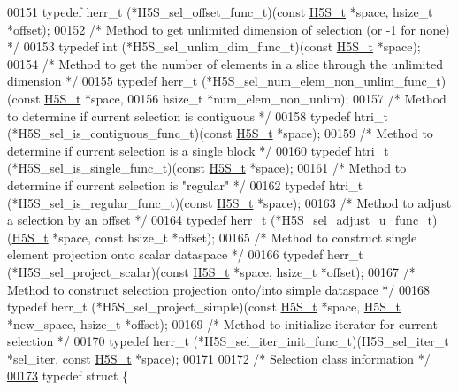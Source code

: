 \begin{DoxyCode}
00151 \textcolor{keyword}{typedef} herr\_t (*H5S\_sel\_offset\_func\_t)(\textcolor{keyword}{const} \hyperlink{struct_h5_s__t}{H5S\_t} *space, hsize\_t *offset);
00152 \textcolor{comment}{/* Method to get unlimited dimension of selection (or -1 for none) */}
00153 \textcolor{keyword}{typedef} int (*H5S\_sel\_unlim\_dim\_func\_t)(\textcolor{keyword}{const} \hyperlink{struct_h5_s__t}{H5S\_t} *space);
00154 \textcolor{comment}{/* Method to get the number of elements in a slice through the unlimited dimension */}
00155 \textcolor{keyword}{typedef} herr\_t (*H5S\_sel\_num\_elem\_non\_unlim\_func\_t)(\textcolor{keyword}{const} \hyperlink{struct_h5_s__t}{H5S\_t} *space,
00156     hsize\_t *num\_elem\_non\_unlim);
00157 \textcolor{comment}{/* Method to determine if current selection is contiguous */}
00158 \textcolor{keyword}{typedef} htri\_t (*H5S\_sel\_is\_contiguous\_func\_t)(\textcolor{keyword}{const} \hyperlink{struct_h5_s__t}{H5S\_t} *space);
00159 \textcolor{comment}{/* Method to determine if current selection is a single block */}
00160 \textcolor{keyword}{typedef} htri\_t (*H5S\_sel\_is\_single\_func\_t)(\textcolor{keyword}{const} \hyperlink{struct_h5_s__t}{H5S\_t} *space);
00161 \textcolor{comment}{/* Method to determine if current selection is "regular" */}
00162 \textcolor{keyword}{typedef} htri\_t (*H5S\_sel\_is\_regular\_func\_t)(\textcolor{keyword}{const} \hyperlink{struct_h5_s__t}{H5S\_t} *space);
00163 \textcolor{comment}{/* Method to adjust a selection by an offset */}
00164 \textcolor{keyword}{typedef} herr\_t (*H5S\_sel\_adjust\_u\_func\_t)(\hyperlink{struct_h5_s__t}{H5S\_t} *space, \textcolor{keyword}{const} hsize\_t *offset);
00165 \textcolor{comment}{/* Method to construct single element projection onto scalar dataspace */}
00166 \textcolor{keyword}{typedef} herr\_t (*H5S\_sel\_project\_scalar)(\textcolor{keyword}{const} \hyperlink{struct_h5_s__t}{H5S\_t} *space, hsize\_t *offset);
00167 \textcolor{comment}{/* Method to construct selection projection onto/into simple dataspace */}
00168 \textcolor{keyword}{typedef} herr\_t (*H5S\_sel\_project\_simple)(\textcolor{keyword}{const} \hyperlink{struct_h5_s__t}{H5S\_t} *space, \hyperlink{struct_h5_s__t}{H5S\_t} *new\_space, hsize\_t *offset);
00169 \textcolor{comment}{/* Method to initialize iterator for current selection */}
00170 \textcolor{keyword}{typedef} herr\_t (*H5S\_sel\_iter\_init\_func\_t)(H5S\_sel\_iter\_t *sel\_iter, \textcolor{keyword}{const} \hyperlink{struct_h5_s__t}{H5S\_t} *space);
00171 
00172 \textcolor{comment}{/* Selection class information */}
\hyperlink{struct_h5_s__select__class__t}{00173} \textcolor{keyword}{typedef} \textcolor{keyword}{struct }\{

\end{DoxyCode}
